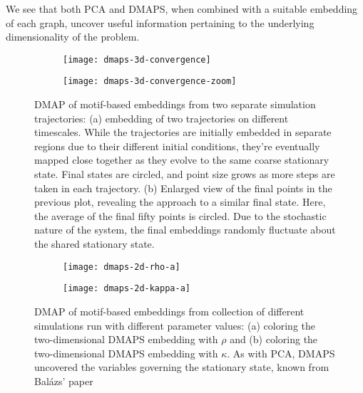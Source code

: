 \documentclass[epjST, final]{svjour}
\begin{document}
\begin{onehalfspace}
We see that both PCA and DMAPS, when combined with a suitable embedding of each graph, uncover useful information pertaining to the underlying dimensionality of the problem.


\begin{figure}[h!]
  \vspace{-5mm}
  \centering
  \begin{subfigure}{0.49\textwidth}
    \centering
    \texttt{[image: dmaps-3d-convergence]}
    \subcaption{\label{fig:dmaps-results-regular}}
  \end{subfigure} %
  \begin{subfigure}{0.49\textwidth}
    \centering
    \texttt{[image: dmaps-3d-convergence-zoom]}
    \subcaption{\label{fig:dmaps-results-zoom}}
  \end{subfigure}%
  \caption{DMAP of motif-based embeddings from two separate simulation
    trajectories: (a) embedding of two trajectories on different
    timescales. While the trajectories are initially embedded in
    separate regions due to their different initial conditions,
    they're eventually mapped close together as they evolve to the
    same coarse stationary state. Final states are circled, and point
    size grows as more steps are taken in each trajectory. (b)
    Enlarged view of the final points in the previous plot, revealing
    the approach to a similar final state. Here, the average of the
    final fifty points is circled. Due to the stochastic nature of
    the system, the final embeddings randomly fluctuate about the
    shared stationary state. \label{fig:dmaps-results}}
\end{figure}

\begin{figure}[h!]
  \vspace{-5mm}
  \centering
  \begin{subfigure}{0.49\textwidth}
    \centering
    \texttt{[image: dmaps-2d-rho-a]}
    \subcaption{\label{fig:dmaps-rho}}
  \end{subfigure} %
  \begin{subfigure}{0.49\textwidth}
    \centering
    \texttt{[image: dmaps-2d-kappa-a]}
    \subcaption{\label{fig:dmaps-kappa}}
  \end{subfigure}%
  \caption{DMAP of motif-based embeddings from collection of different
    simulations run with different parameter values: (a) coloring the
    two-dimensional DMAPS embedding with $\rho$ and (b) coloring the
    two-dimensional DMAPS embedding with $\kappa$. As with PCA, DMAPS
    uncovered the variables governing the stationary state, known from
    Bal\'{a}zs' paper \label{fig:dmaps-rk}}
\end{figure}



\end{onehalfspace}
\end{document}
